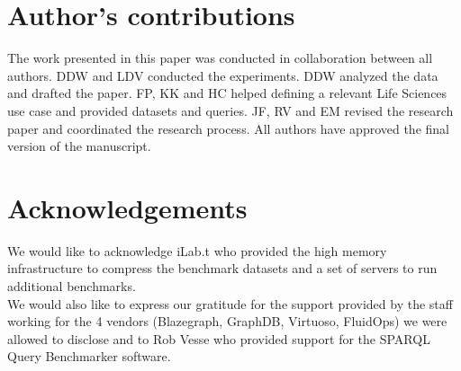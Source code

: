 \documentclass[twocolumn]{bmcart}%
\begin{document}
\begin{backmatter}
\section*{Author's contributions}
The work presented in this paper was conducted in collaboration between all authors. DDW and
LDV conducted the experiments. DDW analyzed the data and drafted the paper. FP, KK and HC helped defining a relevant Life Sciences use case and provided datasets and queries. JF, RV and EM revised the research paper and coordinated the research process. All authors have approved the final version of the manuscript. 

\section*{Acknowledgements}
We would like to acknowledge iLab.t who provided the high memory infrastructure to compress the benchmark datasets and a set of servers to run additional benchmarks.\\
We would also like to express our gratitude for the support provided by the staff working for the 4 vendors (Blazegraph, GraphDB, Virtuoso, FluidOps) we were allowed to disclose and to Rob Vesse who provided support for the SPARQL Query Benchmarker software.





\end{backmatter}
\end{document}
